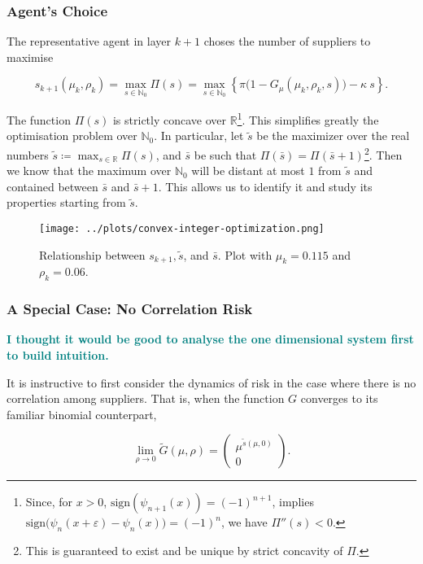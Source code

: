 \documentclass[draft, american, abstract=on]{scrartcl}
\theoremstyle{plain}
\renewcommand{\Re}{\mathbb{R}}
\newcommand\notes[1]{\textcolor{teal}{\footnotesize \textbf{#1}}}
\begin{document}
\subsubsection{Agent's Choice}

The representative agent in layer $k + 1$ choses the number of suppliers to maximise

\begin{equation}
  s_{k + 1}(\mu_k, \rho_k) = \max_{s \in \mathbb{N}_0} \Pi(s) =\max_{s \in \mathbb{N}_0} \left\{ \pi \Big(1 - G_{\mu}(\mu_k, \rho_k, s)\Big) - \kappa \  s \right\}.
\end{equation}

The function $\Pi(s)$ is strictly concave over $\Re$\footnote{
  Since, for $x > 0$, $\text{sign}(\psi_{n + 1}(x)) = (-1)^{n + 1}$, implies $\text{sign}\big(\psi_n(x + \varepsilon) - \psi_n(x) \big) = (-1)^n$, we have $\Pi''(s) < 0$.
}. This simplifies greatly the optimisation problem over $\mathbb{N}_0$. In particular, let $\tilde{s}$ be the maximizer over the real numbers $\tilde{s} \coloneqq \max_{s \in \mathbb{R}} \Pi(s)$, and $\bar{s}$ be such that $\Pi(\bar{s}) = \Pi(\bar{s} + 1)$\footnote{This is guaranteed to exist and be unique by strict concavity of $\Pi$.}. Then we know that the maximum over $\mathbb{N}_0$ will be distant at most $1$ from $\tilde{s}$ and contained between $\bar{s}$ and $\bar{s} + 1$. This allows us to identify it and study its properties starting from $\tilde{s}$.

\begin{figure}[H]
  \centering
  \texttt{[image: ../plots/convex-integer-optimization.png]}
  \caption{Relationship between $s_{k + 1}, \tilde{s}$, and $\bar{s}$. Plot with $\mu_k = 0.115$ and $\rho_k = 0.06$.}
  \label{fig:convex-integer-optimization}
\end{figure}

\subsubsection{A Special Case: No Correlation Risk}

\notes{I thought it would be good to analyse the one dimensional system first to build intuition.}

It is instructive to first consider the dynamics of risk in the case where there is no correlation among suppliers. That is, when the function $G$ converges to its familiar binomial counterpart,

\begin{equation}
   \lim_{\rho \rightarrow 0} \tilde{G}(\mu, \rho) = \begin{pmatrix} \mu^{\tilde{s}(\mu, 0)} \\ 0 \end{pmatrix}.
\end{equation}
\end{document}
